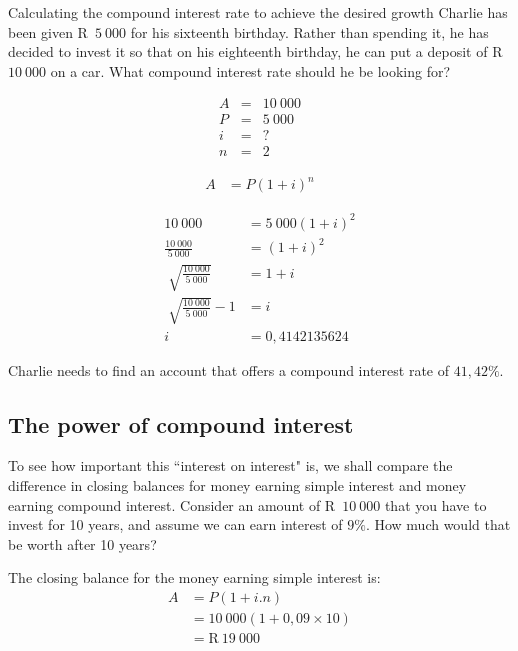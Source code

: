 \begin{wex}{Calculating the compound interest rate to achieve the desired growth}{
    Charlie has been given R~$5~000$ for his sixteenth birthday. Rather than spending it, he has decided to invest it so that on his eighteenth birthday, he can put a deposit of R~$10~000$ on a car. What compound interest rate should he be looking for?}{
    
    \begin{eqnarray*}
	A &=& 10~000\\
	P &=& 5~000\\
	i &=& ?\\
	n &=& 2
    \end{eqnarray*}

    \begin{align*}
	A &= P(1 + i)^n
    \end{align*}

    \begin{align*}
	10~000 &= 5~000(1 + i)^2\\
	\frac{10~000}{5~000}&= (1 +i)^2\\[5pt]
	\sqrt[]{\frac{10~000}{5~000}} &= 1 + i\\[5pt]
	\sqrt[]{\frac{10~000}{5~000}} - 1 &= i\\
	i &= 0,4142135624
    \end{align*}

    Charlie needs to find an account that offers a compound interest rate of $41,42\%$.
    }
\end{wex}


\subsection{The power of compound interest}

To see how important this “interest on interest" is, we shall compare the difference in closing balances for money earning simple interest and money earning compound interest. Consider an amount of R~$10~000$ that you have to invest for 10 years, and assume we can earn interest of $9\%$. How much would that be worth after 10 years?\par

The closing balance for the money earning simple interest is:
\begin{align*}
    A &= P(1 + i . n)\\
      &= 10~000(1 + 0,09 \times 10)\\
      &= \mbox{R}~19~000\\
\end{align*}

